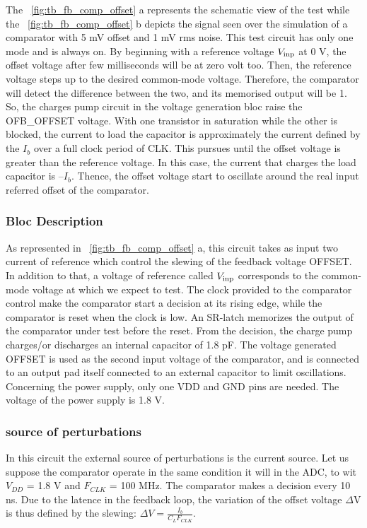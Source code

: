 The \figurename~\ref{fig:tb_fb_comp_offset} a represents the schematic view of the test while the \figurename~\ref{fig:tb_fb_comp_offset} b depicts the signal seen over the simulation of a comparator with 5 mV offset and 1 mV rms noise. This test circuit has only one mode and is always on. By beginning with a reference voltage $V_{\rm inp}$ at 0 V, the offset voltage after few milliseconds will be at zero volt too. Then, the reference voltage steps up to the desired common-mode voltage. Therefore, the comparator will detect the difference between the two, and its memorised output will be 1. So, the charges pump circuit in the voltage generation bloc raise the OFB\_OFFSET voltage. With one transistor in saturation while the other is blocked, the current to load the capacitor is approximately the current defined by the $I_b$ over a full clock period of CLK. This pursues until the offset voltage is greater than the reference voltage. In this case, the current that charges the load capacitor is $–I_b$. Thence, the offset voltage start to oscillate around the real input referred offset of the comparator.

\subsubsection{Bloc Description}
As represented in \figurename~\ref{fig:tb_fb_comp_offset} a, this circuit takes as input two current of reference which control the slewing of the feedback voltage OFFSET\@. In addition to that, a voltage of reference called $V_{\rm inp}$ corresponds to the common-mode voltage at which we expect to test. The clock provided to the comparator control make the comparator start a decision at its rising edge, while the comparator is reset when the clock is low. An SR-latch memorizes the output of the comparator under test before the reset. From the decision, the charge pump charges/or discharges an internal capacitor of 1.8 pF. The voltage generated OFFSET is used as the second input voltage of the comparator, and is connected to an output pad itself connected to an external capacitor to limit oscillations. Concerning the power supply, only one VDD and GND pins are needed. The voltage of the power supply is 1.8 V.

\subsubsection{source of perturbations}
In this circuit the external source of perturbations is the current source. Let us suppose the comparator operate in the same condition it will in the ADC\@, to wit $V_{DD}$ = 1.8 V and $F_{CLK}$ = 100 MHz. The comparator makes a decision every 10 ns. Due to the latence in the feedback loop, the variation of the offset voltage $\Delta$V is thus defined by the slewing: $\Delta V = \frac{I_b}{C_L F_{CLK}}$.

